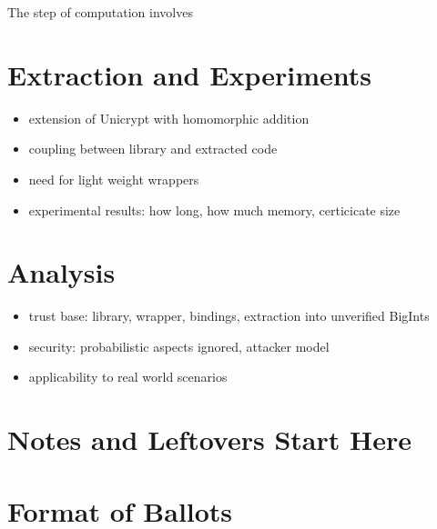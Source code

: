 \documentclass{llncs}
\begin{document}
 The step of computation involves 
 

 

 




\section{Extraction and Experiments}
\begin{itemize}
  \item extension of Unicrypt with homomorphic addition
  \item coupling between library and extracted code
  \item need for light weight wrappers
  \item experimental results: how long, how much memory, certicicate
  size
\end{itemize}

\section{Analysis}
\begin{itemize}
  \item trust base: library, wrapper, bindings, extraction into
  unverified BigInts
  \item security: probabilistic aspects ignored, attacker model
  \item applicability to real world scenarios
\end{itemize}




\appendix
\section*{Notes and Leftovers Start Here}



\section{Format of Ballots}
\end{document}
